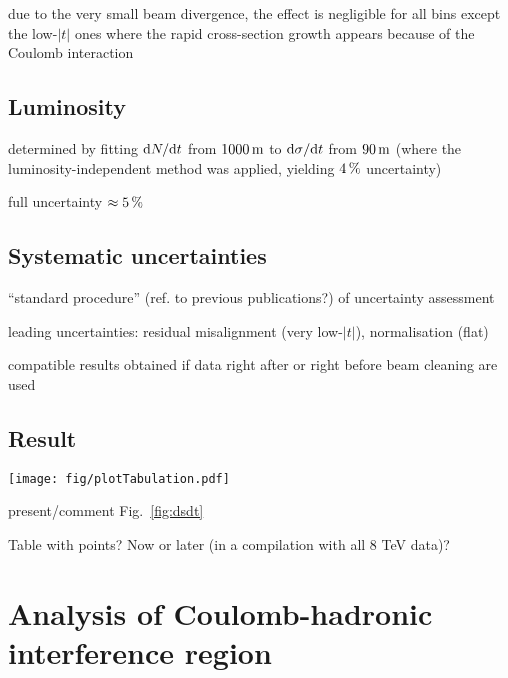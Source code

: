 \documentclass[TOTEM]{cern/cernphprep}
\def\d{{\rm d}}
\def\un#1{\,{\rm #1}}
\def\hang{\hangindent=\parindent}
\def\>{\par\vskip\itskip\parindent\itindent\indent\hang\llap{\hbox to3mm{$\bullet$\hss}}}
\def\>E{\par\vskip\itskip\parindent\itindent\indent\hang\llap{\hbox to3mm{\hss}}}
\def\>>{\par\vskip\iitskip\parindent\iitindent\indent\hang\llap{\hbox to\iitindent{\hss--\ }}}
\begin{document}
\> due to the very small beam divergence, the effect is negligible for all bins except the low-$|t|$ ones where the rapid cross-section growth appears because of the Coulomb interaction

\subsection{Luminosity}

\> determined by fitting $\d N/\d t$ from $1000\un{m}$ to $\d\sigma/\d t$ from $90\un{m}$ (where the luminosity-independent method was applied, yielding $4\un{\%}$ uncertainty)

\> full uncertainty $\approx 5\un{\%}$


\subsection{Systematic uncertainties}

\> ``standard procedure'' (ref. to previous publications?) of uncertainty assessment

\> leading uncertainties: residual misalignment (very low-$|t|$), normalisation (flat)

\> compatible results obtained if data right after or right before beam cleaning are used



\subsection{Result}

\begin{figure*}
\begin{center}
\texttt{[image: fig/plotTabulation.pdf]}
\vskip-3mm
\caption{Differential cross-section.}
\label{fig:dsdt}
\end{center}
\end{figure*}

\> present/comment Fig.~\ref{fig:dsdt}

\> Table with points? Now or later (in a compilation with all 8 TeV data)?


\section{Analysis of Coulomb-hadronic interference region}
\end{document}

